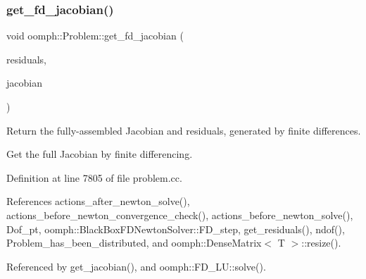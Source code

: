 \mbox{\label{classoomph_1_1Problem_a74f6540dc7228b21f5bc07c0477dfbe7}} 
\subsubsection{\texorpdfstring{get\+\_\+fd\+\_\+jacobian()}{get\_fd\_jacobian()}}
{\footnotesize\ttfamily void oomph\+::\+Problem\+::get\+\_\+fd\+\_\+jacobian (\begin{DoxyParamCaption}\item[{\hyperlink{classoomph_1_1DoubleVector}{Double\+Vector} \&}]{residuals,  }\item[{\hyperlink{classoomph_1_1DenseMatrix}{Dense\+Matrix}$<$ double $>$ \&}]{jacobian }\end{DoxyParamCaption})}



Return the fully-\/assembled Jacobian and residuals, generated by finite differences. 

Get the full Jacobian by finite differencing. 

Definition at line 7805 of file problem.\+cc.



References actions\+\_\+after\+\_\+newton\+\_\+solve(), actions\+\_\+before\+\_\+newton\+\_\+convergence\+\_\+check(), actions\+\_\+before\+\_\+newton\+\_\+solve(), Dof\+\_\+pt, oomph\+::\+Black\+Box\+F\+D\+Newton\+Solver\+::\+F\+D\+\_\+step, get\+\_\+residuals(), ndof(), Problem\+\_\+has\+\_\+been\+\_\+distributed, and oomph\+::\+Dense\+Matrix$<$ T $>$\+::resize().



Referenced by get\+\_\+jacobian(), and oomph\+::\+F\+D\+\_\+\+L\+U\+::solve().

\mbox{\label{classoomph_1_1Problem_a22b3818d62b66e5cb52d72dcccc037fa}} 
